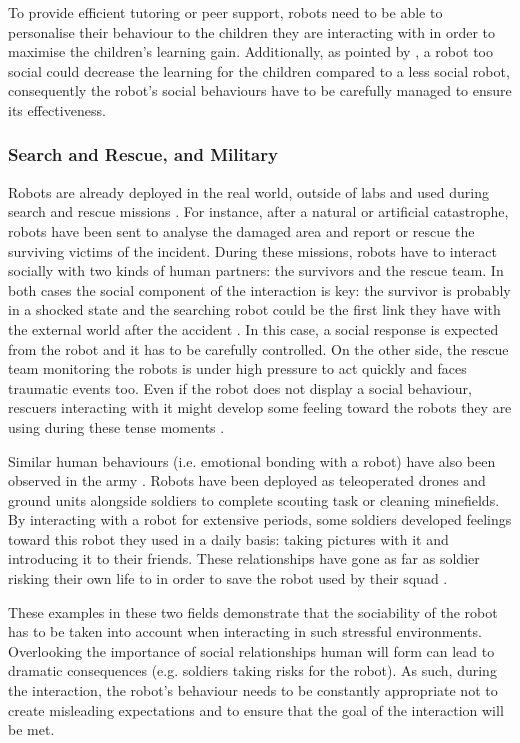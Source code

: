 	To provide efficient tutoring or peer support, robots need to be able to personalise their behaviour to the children they are interacting with in order to maximise the children's learning gain. Additionally, as pointed by \citet{kennedy2015robot}, a robot too social could decrease the learning for the children compared to a less social robot, consequently the robot's social behaviours have to be carefully managed to ensure its effectiveness. 
	
\subsubsection{Search and Rescue, and Military} 
	
    Robots are already deployed in the real world, outside of labs and used during search and rescue missions \citep{murphy2008search}. For instance, after a natural or artificial catastrophe, robots have been sent to analyse the damaged area and report or rescue the surviving victims of the incident. During these missions, robots have to interact socially with two kinds of human partners: the survivors and the rescue team. In both cases the social component of the interaction is key: the survivor is probably in a shocked state and the searching robot could be the first link they have with the external world after the accident \citep{murphy2008search}. In this case, a social response is expected from the robot and it has to be carefully controlled. On the other side, the rescue team monitoring the robots is under high pressure to act quickly and faces traumatic events too. Even if the robot does not display a social behaviour, rescuers interacting with it might develop some feeling toward the robots they are using during these tense moments \citep{fincannon2004evidence}.
	
    Similar human behaviours (i.e. emotional bonding with a robot) have also been observed in the army \citep{singer2009wired}. Robots have been deployed as teleoperated drones and ground units alongside soldiers to complete scouting task or cleaning minefields. By interacting with a robot for extensive periods, some soldiers developed feelings toward this robot they used in a daily basis: taking pictures with it and introducing it to their friends. These relationships have gone as far as soldier risking their own life to in order to save the robot used by their squad \citep{singer2009wired}. 
    
    These examples in these two fields demonstrate that the sociability of the robot has to be taken into account when interacting in such stressful environments. Overlooking the importance of social relationships human will form can lead to dramatic consequences (e.g. soldiers taking risks for the robot). As such, during the interaction, the robot's behaviour needs to be constantly appropriate not to create misleading expectations and to ensure that the goal of the interaction will be met.
		
